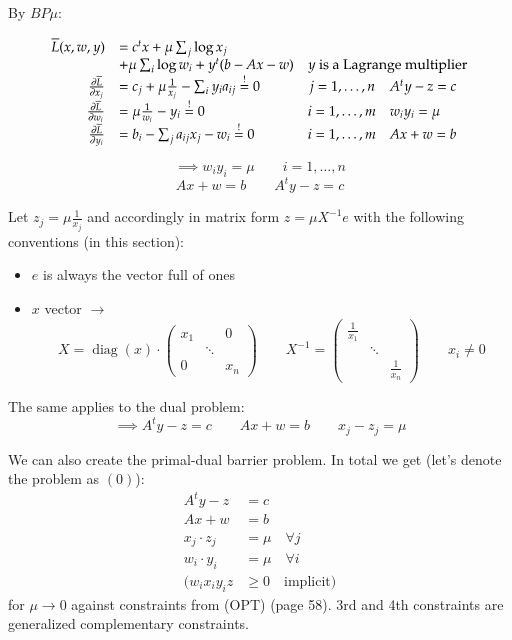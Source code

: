 \documentclass[a4paper]{article}
\numberwithin{lecref}{section}
\begin{document}
By $BP\mu$:

\[
	\begin{array}{rlcl}
		\overline L(x, w, y) &= c^t x + \mu \sum_j \log x_j & & \\
			&+ \mu \sum_i \log w_i + y^t (b - Ax - w) & \multicolumn{2}{c}{y \text{ is a Lagrange multiplier}} \\
		\frac{\partial \overline L}{\partial x_j} &= c_j + \mu \frac{1}{x_j} - \sum_i y_i a_{ij} \overset!= 0 & j = 1, \dots, n & A^t y - z = c \\
		\frac{\partial \overline L}{\partial w_i} &= \mu \frac{1}{w_i} - y_i \overset!= 0 & i = 1, \dots, m & w_i y_i = \mu \\
		\frac{\partial \overline L}{\partial y_i} &= b_i - \sum_j a_{ij} x_j - w_i \overset!= 0 & i = 1, \dots, m & Ax + w = b
	\end{array}
\]

\[ \implies w_i y_i = \mu \qquad i = 1, \dots, n \]
\[ Ax + w = b \qquad A^t y - z = c \]

Let $z_j = \mu \frac1{x_j}$ and accordingly in matrix form $z = \mu X^{-1} e$ with the following conventions (in this section):
\begin{itemize}
	\item $e$ is always the vector full of ones
	\item $x$ vector $\to$
		\[ X = \operatorname{diag}(x) \cdot \begin{pmatrix} x_1 & & 0 \\ & \ddots & \\ 0 & & x_n \end{pmatrix} \qquad X^{-1} = \begin{pmatrix} \frac{1}{x_1} & & \\ & \ddots & \\ & & \frac{1}{x_n} \end{pmatrix} \qquad x_i \neq 0 \]
\end{itemize}
The same applies to the dual problem:
\[ \implies A^t y - z = c \qquad Ax + w = b \qquad x_j - z_j = \mu \]

We can also create the primal-dual barrier problem.
In total we get (let's denote the problem as $(0)$):
\begin{align*}
	A^t y - z &= c \\
	Ax + w &= b \\
	x_j \cdot z_j &= \mu \quad \forall j \\
	w_i \cdot y_i &= \mu \quad \forall i \\
	(w_i x_i y_i z &\geq 0 \quad \text{implicit})
\end{align*}
for $\mu \to 0$ against constraints from (OPT) (page 58).
3rd and 4th constraints are generalized complementary constraints.
\end{document}
